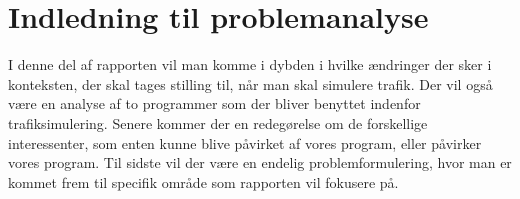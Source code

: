 
\chapter{Indledning til problemanalyse}
I denne del af rapporten vil man komme i dybden i hvilke ændringer der sker i konteksten, der skal tages stilling til, når man skal simulere trafik. Der vil også være en analyse af to programmer som der bliver benyttet indenfor trafiksimulering. Senere kommer der en redegørelse om de forskellige interessenter, som enten kunne blive påvirket af vores program, eller påvirker vores program. Til sidste vil der være en endelig problemformulering, hvor man er kommet frem til specifik område som rapporten vil fokusere på.

